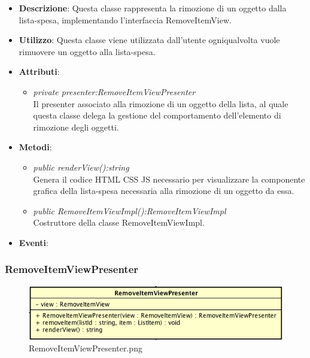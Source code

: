 \begin{itemize}
\item \textbf{Descrizione}: Questa classe rappresenta la rimozione di un oggetto dalla lista-spesa, implementando l'interfaccia RemoveItemView.
\item \textbf{Utilizzo}: Questa classe viene utilizzata dall'utente ogniqualvolta vuole rimuovere un oggetto alla lista-spesa.
\item \textbf{Attributi}: 
	\begin{itemize}
	\item \textit{private presenter:RemoveItemViewPresenter}\\
	Il presenter associato alla rimozione di un oggetto della lista, al quale questa classe delega la gestione del comportamento dell'elemento di rimozione degli oggetti.
	\end{itemize}
\item \textbf{Metodi}:
	\begin{itemize}
	\item \textit{public renderView():string}\\
		Genera il codice HTML CSS JS necessario per visualizzare la componente grafica della lista-spesa necessaria alla rimozione di un oggetto da essa.
	\item \textit{public RemoveItemViewImpl():RemoveItemViewImpl}\\
	Costruttore della classe RemoveItemViewImpl.
	\end{itemize}
\item \textbf{Eventi}:
\end{itemize}

\subsubsection{RemoveItemViewPresenter}

\label{RemoveItemViewPresenter}
\begin{figure}[ht]
	\centering
	\includegraphics[scale=0.5]{Sezioni/SottosezioniST/img/app/RemoveItemViewPresenter.png}
	\caption{RemoveItemViewPresenter.png}
\end{figure}

